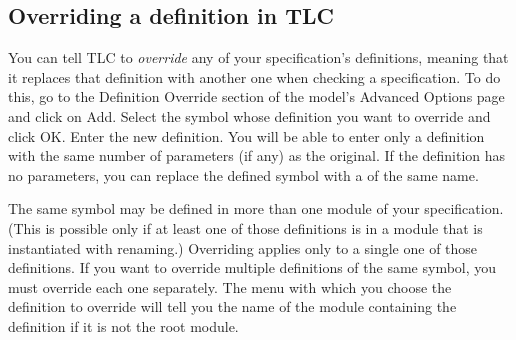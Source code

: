 \documentclass[fleqn,leqno]{article}
\begin{document}
  \vspace{-2\baselineskip}%
\subsection*{Overriding a definition in TLC}

You can tell TLC to \emph{override} any of your specification's
definitions, meaning that it replaces that definition with another one
when checking a specification.  To do this, go to the
\textsf{Definition Override} section of the model's \textsf{Advanced
Options} page and click on \textsf{Add}.  Select the symbol whose
definition you want to override and click \textsf{OK}.  Enter the new
definition.  You will be able to enter only a definition with the same
number of parameters (if any) as the original.  If the definition
has no parameters, you can replace the defined symbol with
a  of the same name.


\medskip
 \noindent
The same symbol may be defined in more than one module of your
specification.  (This is possible only if at least one of those
definitions is in a module that is 
instantiated with renaming.)  Overriding applies only to a single one of those
definitions.  If you want to override multiple definitions of the same
symbol, you must override each one separately.  The menu with which
you choose the definition to override will tell you the name of the
module containing the definition if it is not the root module.
\end{document}
